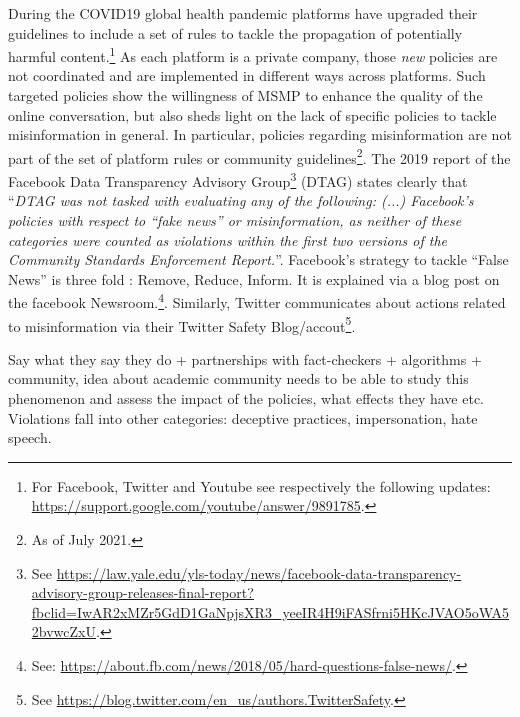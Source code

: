 \documentclass{article}
\begin{document}
\smallskip

During the COVID19 global health pandemic platforms have upgraded their guidelines to include a set of rules to tackle the propagation of potentially harmful content.\footnote{For Facebook, Twitter and Youtube see respectively the following updates: \href{https://support.google.com/youtube/answer/9891785}{https://support.google.com/youtube/answer/9891785}.} As each platform is a private company, those {\it new} policies are not coordinated and are implemented in different ways across platforms. Such targeted policies show the willingness of MSMP to enhance the quality of the online conversation, but also sheds light on the lack of specific policies to tackle misinformation in general. In particular, policies regarding misinformation are not part of the set of platform rules or community guidelines\footnote{As of July 2021.}. The 2019 report of the Facebook Data Transparency Advisory Group\footnote{See \href{https://law.yale.edu/yls-today/news/facebook-data-transparency-advisory-group-releases-final-report?fbclid=IwAR2xMZr5GdD1GaNpjsXR3\_yeeIR4H9iFASfrni5HKcJVAO5oWA52bvwcZxU}{https://law.yale.edu/yls-today/news/facebook-data-transparency-advisory-group-releases-final-report?fbclid=IwAR2xMZr5GdD1GaNpjsXR3\_yeeIR4H9iFASfrni5HKcJVAO5oWA52bvwcZxU}.} (DTAG) states clearly that ``{\it DTAG was not tasked with evaluating any of the following: (...) Facebook’s policies with respect to “fake news” or misinformation, as neither of these categories were counted as violations within the first two versions of the Community Standards Enforcement Report.}''. Facebook's strategy to tackle ``False News'' is three fold : Remove, Reduce, Inform. It is explained via a blog post on the facebook Newsroom.\footnote{See: \href{https://about.fb.com/news/2018/05/hard-questions-false-news/}{https://about.fb.com/news/2018/05/hard-questions-false-news/}.}. Similarly, Twitter communicates about actions related to misinformation via their Twitter Safety Blog/accout\footnote{See \href{https://blog.twitter.com/en\_us/authors.TwitterSafety}{https://blog.twitter.com/en\_us/authors.TwitterSafety}.}. 

{\color{pink} Say what they say they do + partnerships with fact-checkers + algorithms + community,  idea about academic community needs to be able to study this phenomenon and assess the impact of the policies, what effects they have etc. Violations fall into other categories: deceptive practices, impersonation, hate speech. }

\smallskip
\end{document}
